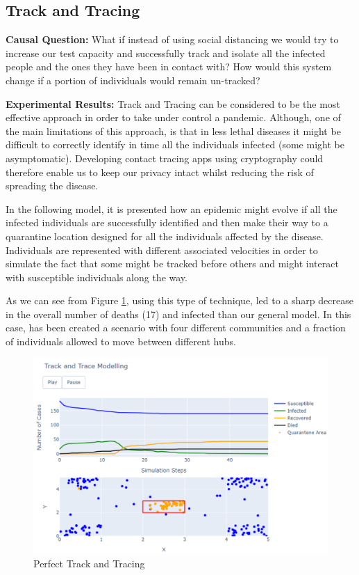 \subsection{Track and Tracing}

\textbf{Causal Question:} What if instead of using social distancing we would try to increase our test capacity and successfully track and isolate all the infected people and the ones they have been in contact with? How would this system change if a portion of individuals would remain un-tracked?

\textbf{Experimental Results:} Track and Tracing can be considered to be the most effective approach in order to take under control a pandemic. Although, one of the main limitations of this approach, is that in less lethal diseases it might be difficult to correctly identify in time all the individuals infected (some might be asymptomatic). Developing contact tracing apps using cryptography could therefore enable us to keep our privacy intact whilst reducing the risk of spreading the disease.

In the following model, it is presented how an epidemic might evolve if all the infected individuals are successfully identified and then make their way to a quarantine location designed for all the individuals affected by the disease. Individuals are represented with different associated velocities in order to simulate the fact that some might be tracked before others and might interact with susceptible individuals along the way.

As we can see from Figure \ref{track1}, using this type of technique, led to a sharp decrease in the overall number of deaths (17) and infected than our general model. In this case, has been created a scenario with four different communities and a fraction of individuals allowed to move between different hubs. 
\begin{figure}[ht!]%
    \centering
    \includegraphics[width=0.85\linewidth]{latex/images/track1.pdf}
    \vspace{-0.3cm}
    \caption{Perfect Track and Tracing}
    \label{track1}
\end{figure}
\vspace{-0.3cm}

